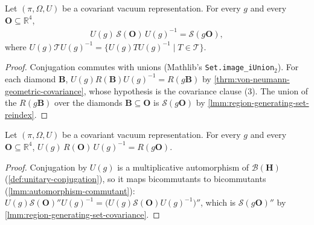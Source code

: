 \begin{lemma}
    \label{lmm:region-generating-set-covariance}
    \leanok
    Let $(\pi, \Omega, U)$ be a covariant vacuum representation. For every $g$ and every $\mathbf{O} \subseteq \mathbb{R}^4$,
    \begin{align}
        U(g)\,\mathcal{S}(\mathbf{O})\,U(g)^{-1} = \mathcal{S}(g\mathbf{O}),
    \end{align}
    where $U(g)\mathcal{T}U(g)^{-1} = \{ U(g)TU(g)^{-1} \mid T \in \mathcal{T} \}$.
\end{lemma}
\begin{proof}
    \leanok
    Conjugation commutes with unions (Mathlib's \texttt{Set.image\_iUnion\ensuremath{_2}}). For each diamond $\mathbf{B}$, $U(g)R(\mathbf{B})U(g)^{-1} = R(g\mathbf{B})$ by \ref{thrm:von-neumann-geometric-covariance}, whose hypothesis is the covariance clause (3). The union of the $R(g\mathbf{B})$ over the diamonds $\mathbf{B} \subseteq \mathbf{O}$ is $\mathcal{S}(g\mathbf{O})$ by \ref{lmm:region-generating-set-reindex}.
\end{proof}

\begin{theorem}
    \label{thrm:region-algebra-covariance}
    \leanok
    Let $(\pi, \Omega, U)$ be a covariant vacuum representation. For every $g$ and every $\mathbf{O} \subseteq \mathbb{R}^4$, $U(g)\,R(\mathbf{O})\,U(g)^{-1} = R(g\mathbf{O})$.
\end{theorem}
\begin{proof}
    \leanok
    Conjugation by $U(g)$ is a multiplicative automorphism of $\mathcal{B}(\mathbf{H})$ (\ref{def:unitary-conjugation}), so it maps bicommutants to bicommutants (\ref{lmm:automorphism-commutant}): $U(g)\mathcal{S}(\mathbf{O})''U(g)^{-1} = \big(U(g)\mathcal{S}(\mathbf{O})U(g)^{-1}\big)''$, which is $\mathcal{S}(g\mathbf{O})''$ by \ref{lmm:region-generating-set-covariance}.
\end{proof}

